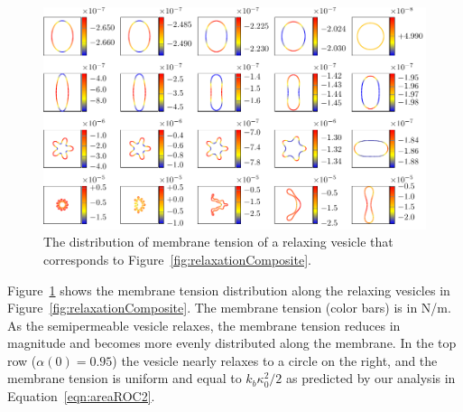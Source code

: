 \documentclass[prb,preprint,showpacs,preprintnumbers,amsmath,amssymb,longbibliography]{revtex4-1}
\newif\ifTikz
\begin{document}
\begin{figure}[htp]
  \centering
  \ifTikz
    
  \else
    \includegraphics{figures/relaxationTensions.pdf}
  \fi
  \caption{\label{fig:relaxationTensions} The distribution of membrane
  tension of a relaxing vesicle that corresponds to
  Figure~\ref{fig:relaxationComposite}.}
\end{figure}
Figure~\ref{fig:relaxationTensions} shows the membrane tension
distribution along the relaxing vesicles in
Figure~\ref{fig:relaxationComposite}. The membrane tension (color bars)
is in N/m. As the semipermeable vesicle relaxes, the membrane tension
reduces in magnitude and becomes more evenly distributed along the
membrane. In the top row ($\alpha(0)=0.95$) the vesicle nearly relaxes
to a circle on the right, and the membrane tension is uniform and equal
to $k_b \kappa_0^2/2$ as predicted by our analysis in
Equation~\eqref{eqn:areaROC2}. 



\end{document}
